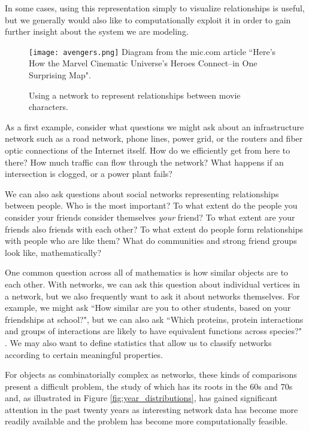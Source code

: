 \documentclass[12pt]{thesis}
\theoremstyle{plain}
\theoremstyle{definition}
\theoremstyle{remark}
\begin{document}
In some cases, using this representation simply to visualize relationships is useful, but we generally would also like to computationally exploit it in order to gain further insight about the system we are modeling. 

\begin{figure}
\centering
\vspace{-15pt}
\texttt{[image: avengers.png]}
\scriptsize
Diagram from the mic.com article ``Here's How the Marvel Cinematic Universe's Heroes Connect--in One Surprising Map".
\caption{Using a network to represent relationships between movie characters.}
\vspace{-20pt}
\label{fig:avengers}
\end{figure}

As a first example, consider what questions we might ask about an infrastructure network such as a road network, phone lines, power grid, or the routers and fiber optic connections of the Internet itself. How do we efficiently get from here to there? How much traffic can flow through the network? What happens if an intersection is clogged, or a power plant fails? 

We can also ask questions about social networks representing relationships between people. Who is the most important? To what extent do the people you consider your friends consider themselves \textit{your} friend?  To what extent are your friends also friends with each other? To what extent do people form relationships with people who are like them? What do communities and strong friend groups look like, mathematically?

One common question across all of mathematics is how similar objects are to each other. With networks, we can ask this question about individual vertices in a network, but we also frequently want to ask it about networks themselves. For example, we might ask ``How similar are you to other students, based on your friendships at school?", but we can also ask ``Which proteins, protein interactions and groups of interactions are likely to have equivalent functions across species?" \cite{Sharan_2006}. We may also want to define statistics that allow us to classify networks according to certain meaningful properties.

For objects as combinatorially complex as networks, these kinds of comparisons present a difficult problem, the study of which has its roots in the 60s and 70s \cite{Conte_2004} and, as illustrated in Figure \ref{fig:year_distributions}, has gained significant attention in the past twenty years as interesting network data has become more readily available and the problem has become more computationally feasible.
\end{document}
